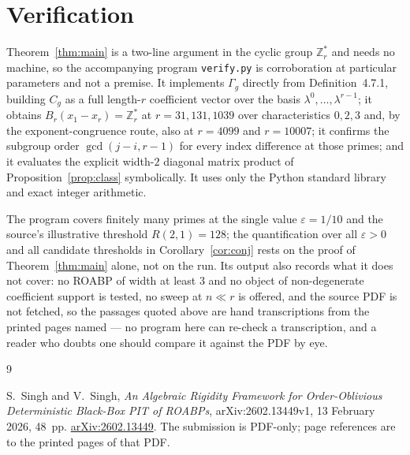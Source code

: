 \documentclass[11pt]{amsart}
\theoremstyle{definition}
\theoremstyle{remark}
\newcommand{\Zrs}{\mathbb{Z}_r^{*}}
\newcommand{\Bad}{B_r}
\newcommand{\Gam}{\Gamma}
\begin{document}
\section{Verification}

Theorem~\ref{thm:main} is a two-line argument in the cyclic group $\Zrs$ and needs no machine, so
the accompanying program \texttt{verify.py} is corroboration at particular parameters and not a
premise. It implements $\Gam_g$ directly from Definition~4.7.1, building $C_g$ as a full length-$r$
coefficient vector over the basis $\lambda^0,\dots,\lambda^{r-1}$; it obtains $\Bad(x_1-x_r)=\Zrs$
at $r=31,131,1039$ over characteristics $0,2,3$ and, by the exponent-congruence route, also at
$r=4099$ and $r=10007$; it confirms the subgroup order $\gcd(j-i,r-1)$ for every index difference
at those primes; and it evaluates the explicit width-$2$ diagonal matrix product of
Proposition~\ref{prop:class} symbolically. It uses only the Python standard library and exact
integer arithmetic.

\medskip
\noindent The program covers finitely many primes at the single value $\varepsilon=1/10$ and the
source's illustrative threshold $R(2,1)=128$; the quantification over all $\varepsilon>0$ and all
candidate thresholds in Corollary~\ref{cor:conj} rests on the proof of Theorem~\ref{thm:main}
alone, not on the run. Its output also records what it does not cover: no ROABP of width at least
$3$ and no object of non-degenerate coefficient support is tested, no sweep at $n\ll r$ is offered,
and the source PDF is not fetched, so the passages quoted above are hand transcriptions from the
printed pages named --- no program here can re-check a transcription, and a reader who doubts one
should compare it against the PDF by eye.

\begin{thebibliography}{9}

S.~Singh and V.~Singh,
\emph{An Algebraic Rigidity Framework for Order-Oblivious Deterministic Black-Box PIT of ROABPs},
arXiv:2602.13449v1, 13 February 2026, 48~pp.
\href{https://arxiv.org/abs/2602.13449}{arXiv:2602.13449}.
The submission is PDF-only; page references are to the printed pages of that PDF.

\end{thebibliography}
\end{document}
